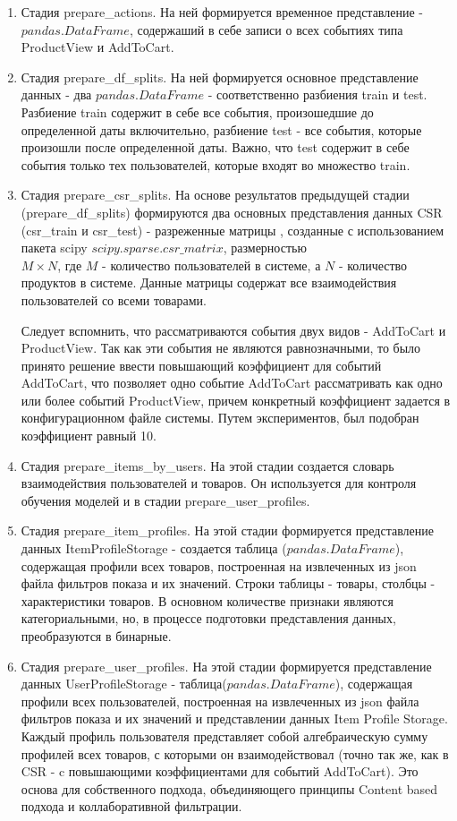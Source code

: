 \documentclass[14pt]{mmcs_article}
\newenvironment{myenumerate}
{ \begin{enumerate}
		\setlength{\itemsep}{0pt}
		\setlength{\parskip}{0pt}
		\setlength{\parsep}{0pt}     }
	{ \end{enumerate}                  }
\begin{document}
\begin{myenumerate}
	\item Стадия prepare\_actions. На ней формируется временное представление - $pandas$.$DataFrame$, содержаший в себе записи о всех событиях типа  ProductView и AddToCart.
	\item Стадия prepare\_df\_splits. На ней формируется основное представление данных - два  $pandas$.$DataFrame$ - соответственно разбиения train и test. Разбиение train содержит в себе все события, произошедшие до определенной даты включительно, разбиение test - все события, которые произошли после определенной даты. Важно, что test содержит в себе события только тех пользователей, которые входят во множество train. 
	\item Стадия prepare\_csr\_splits. На основе результатов предыдущей стадии  (prepare\_df\_splits) формируются два основных представления данных CSR (csr\_train и csr\_test) - разреженные матрицы , созданные с использованием пакета scipy $scipy$.$sparse$.$csr\_matrix$, размерностью \\ $M \times N$, где $M$ - количество пользователей в системе, а $N$ - количество продуктов в системе. Данные матрицы содержат все взаимодействия пользователей со всеми товарами. 
	
	Следует вспомнить, что рассматриваются события двух видов - AddToCart и ProductView. Так как эти события не являются равнозначными, то было принято решение ввести повышающий коэффициент для событий AddToCart, что позволяет одно событие AddToCart рассматривать как одно или более событий ProductView, причем конкретный коэффициент задается в конфигурационном файле системы. Путем экспериментов, был подобран коэффициент равный 10.
	\item Стадия prepare\_items\_by\_users. На этой стадии создается словарь взаимодействия пользователей и товаров. Он используется для контроля обучения моделей и в стадии prepare\_user\_profiles.
	\item Стадия prepare\_item\_profiles. На этой стадии формируется представление данных ItemProfileStorage - создается таблица ($pandas$.$DataFrame$), содержащая профили всех товаров, построенная на извлеченных из json файла фильтров показа и их значений. Строки таблицы - товары, столбцы - характеристики товаров. В основном количестве признаки являются категориальными, но, в процессе подготовки представления данных, преобразуются в бинарные.
	\item Стадия prepare\_user\_profiles. На этой стадии формируется представление данных UserProfileStorage - таблица($pandas$.$DataFrame$), содержащая профили всех пользователей, построенная на извлеченных из json файла фильтров показа и их значений и представлении данных Item Profile Storage. Каждый профиль пользователя представляет собой алгебраическую сумму профилей всех товаров, с которыми он взаимодействовал (точно так же, как в CSR - c повышающими коэффициентами для событий AddToCart). Это основа для собственного подхода, объединяющего принципы Content based подхода и коллаборативной фильтрации.
	
\end{myenumerate}
\end{document}
